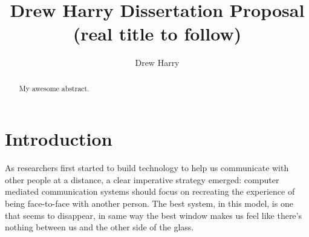 \documentclass{tufte-handout}
\title{Drew Harry Dissertation Proposal (real title to follow)}
\author[Drew Harry]{Drew Harry}
\begin{document}
\maketitle%

\begin{abstract}
\noindent My awesome abstract.
\end{abstract}



\section{Introduction}\label{sec:introduction}





As researchers first started to build technology to help us communicate with other people at a distance, a clear imperative strategy emerged: computer mediated communication systems should focus on recreating the experience of being face-to-face with another person. The best system, in this model, is one that seems to disappear, in same way the best window makes us feel like there's nothing between us and the other side of the glass.
\end{document}
